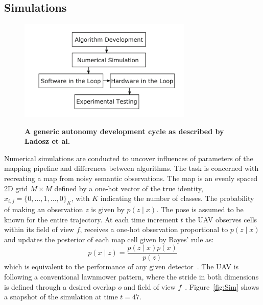 \documentclass[twocolumn,letterpaper]{IEEEAerospaceCLS}  %
\begin{document}
\subsection{Simulations} \label{ssec:MetSim}
\begin{figure}
    \centering
    \includegraphics[width=3.25in]{2-3DevelopmentCycle}\\
    \caption{\bf{A generic autonomy development cycle as described by Ladosz et al.~\protect\cite{ladosz_generic_2019}}}
    \label{fig:DevProcess}
\end{figure}
Numerical simulations are conducted to uncover influences of parameters of the mapping pipeline and differences between algorithms. The task is concerned with recreating a map from noisy semantic observations. The map is an evenly spaced 2D grid $M \times M$ defined by a one-hot vector of the true identity, $x_{i,j} = \{0,..., 1, ..., 0\}_K$, with $K$ indicating the number of classes. The probability of making an observation $z$ is given by $p(z\mid x)$. The pose is assumed to be known for the entire trajectory. At each time increment $t$ the UAV observes cells within its field of view $f$, receives a one-hot observation proportional to $p(z\mid x)$ and updates the posterior of each map cell given by Bayes' rule as:
\begin{equation} \label{eq:Bayes}
    p(x\mid z) = \frac{p(z\mid x) p(x)}{p(z)}
\end{equation}
which is equivalent to the performance of any given detector~\cite{alom_history_2018}.
The UAV is following a conventional lawnmower pattern, where the stride in both dimensions is defined through a desired overlap $o$ and field of view $f$~\cite{shetty_implementation_2020}. Figure~\ref{fig:Sim} shows a snapshot of the simulation at time $t=47$.
\end{document}
